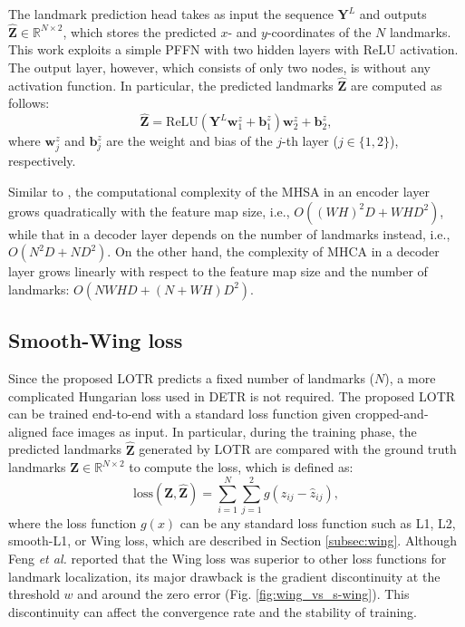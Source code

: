 \documentclass[journal]{IEEEtran}
\begin{document}
The landmark prediction head takes as input the sequence $\mathbf{Y}^L$ and outputs $\hat{\mathbf{Z}} \in \mathbb{R}^{N \times 2}$, which stores the predicted $x$- and $y$-coordinates of the $N$ landmarks.
This work exploits a simple PFFN with two hidden layers with ReLU activation. 
The output layer, however, which consists of only two nodes, is without any activation function. 
In particular, the predicted landmarks $\hat{\mathbf{Z}}$ are computed as follows:
\begin{equation}
    \hat{\mathbf{Z}} =  \text{ReLU}(\mathbf{Y}^L\mathbf{w}_1^z + \mathbf{b}_1^z )\mathbf{w}_2^z + \mathbf{b}_2^z,
\end{equation}
where $\mathbf{w}_j^z$ and $\mathbf{b}_j^z$ are the weight and bias of the $j$-th layer ($j \in \{1, 2\}$), respectively.

Similar to \cite{Carion2020}, the computational complexity of the MHSA in an encoder layer grows quadratically with the feature map size, i.e., $O((WH)^2D + WHD^2)$, while that in a decoder layer depends on the number of landmarks instead, i.e., $O(N^2D + ND^2)$. On the other hand, the complexity of MHCA in a decoder layer grows linearly with respect to the feature map size and the number of landmarks: $O(NWHD + (N+WH)D^2)$.


\subsection{Smooth-Wing loss}\label{subsec:loss}

Since the proposed LOTR predicts a fixed number of landmarks ($N$), a more complicated Hungarian loss used in DETR \cite{Carion2020} is not required. 
The proposed LOTR can be trained end-to-end with a standard loss function given cropped-and-aligned face images as input.
In particular, during the training phase, the predicted landmarks $\hat{\mathbf{Z}}$ generated by LOTR are compared with the ground truth landmarks $\mathbf{Z} \in \mathbb{R}^{N \times 2}$ to compute the loss, which is defined as:
\begin{equation}
    \label{eq:loss}
    \text{loss}(\mathbf{Z}, \hat{\mathbf{Z}}) = \sum_{i=1}^N \sum_{j=1}^2 g(z_{ij} - \hat{z}_{ij}),
\end{equation}
where the loss function $g(x)$ can be any standard loss function such as L1, L2, smooth-L1, or Wing loss, which are described in Section \ref{subsec:wing}. 
Although Feng \textit{et al.} \cite{Feng2017} reported that the Wing loss was superior to other loss functions for landmark localization, its major drawback is the gradient discontinuity at the threshold $w$ and around the zero error (Fig. \ref{fig:wing_vs_s-wing}). 
This discontinuity can affect the convergence rate and the stability of training.
\end{document}
